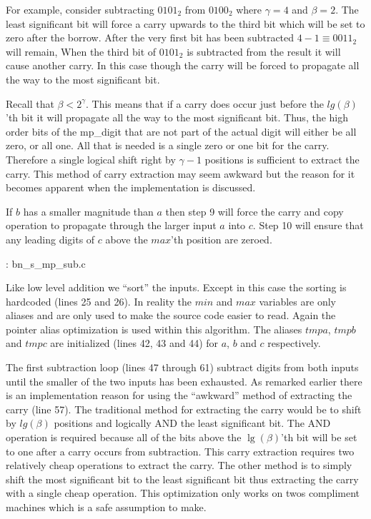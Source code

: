 \documentclass[b5paper]{book}
\begin{document}
For example, consider subtracting $0101_2$ from $0100_2$ where $\gamma = 4$ and $\beta = 2$.  The least significant bit will force a carry upwards to 
the third bit which will be set to zero after the borrow.  After the very first bit has been subtracted $4 - 1 \equiv 0011_2$ will remain,  When the 
third bit of $0101_2$ is subtracted from the result it will cause another carry.  In this case though the carry will be forced to propagate all the 
way to the most significant bit.  

Recall that $\beta < 2^{\gamma}$.  This means that if a carry does occur just before the $lg(\beta)$'th bit it will propagate all the way to the most 
significant bit.  Thus, the high order bits of the mp\_digit that are not part of the actual digit will either be all zero, or all one. All that
is needed is a single zero or one bit for the carry.  Therefore a single logical shift right by $\gamma - 1$ positions is sufficient to extract the 
carry.  This method of carry extraction may seem awkward but the reason for it becomes apparent when the implementation is discussed.  

If $b$ has a smaller magnitude than $a$ then step 9 will force the carry and copy operation to propagate through the larger input $a$ into $c$.  Step
10 will ensure that any leading digits of $c$ above the $max$'th position are zeroed.

\vspace{+3mm}\begin{small}
\hspace{-5.1mm}{\bf File}: bn\_s\_mp\_sub.c
\vspace{-3mm}
\begin{alltt}
\end{alltt}
\end{small}

Like low level addition we ``sort'' the inputs.  Except in this case the sorting is hardcoded 
(lines 25 and 26).  In reality the $min$ and $max$ variables are only aliases and are only 
used to make the source code easier to read.  Again the pointer alias optimization is used 
within this algorithm.  The aliases $tmpa$, $tmpb$ and $tmpc$ are initialized
(lines 42, 43 and 44) for $a$, $b$ and $c$ respectively.

The first subtraction loop (lines 47 through 61) subtract digits from both inputs until the smaller of
the two inputs has been exhausted.  As remarked earlier there is an implementation reason for using the ``awkward'' 
method of extracting the carry (line 57).  The traditional method for extracting the carry would be to shift 
by $lg(\beta)$ positions and logically AND the least significant bit.  The AND operation is required because all of 
the bits above the $\lg(\beta)$'th bit will be set to one after a carry occurs from subtraction.  This carry 
extraction requires two relatively cheap operations to extract the carry.  The other method is to simply shift the 
most significant bit to the least significant bit thus extracting the carry with a single cheap operation.  This 
optimization only works on twos compliment machines which is a safe assumption to make.
\end{document}

